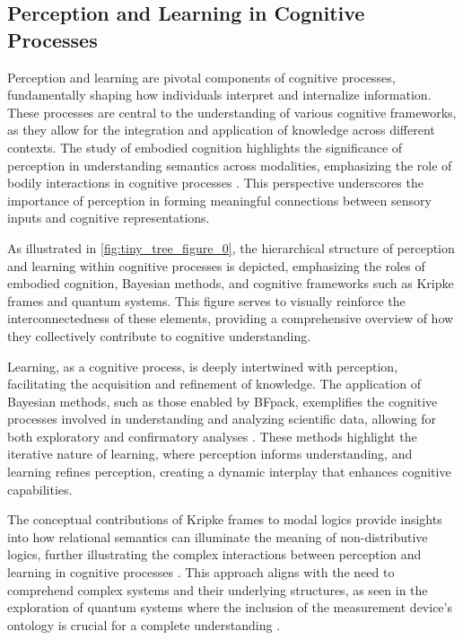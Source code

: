 \subsection{Perception and Learning in Cognitive Processes} \label{subsec:Perception and Learning in Cognitive Processes}

Perception and learning are pivotal components of cognitive processes, fundamentally shaping how individuals interpret and internalize information. These processes are central to the understanding of various cognitive frameworks, as they allow for the integration and application of knowledge across different contexts. The study of embodied cognition highlights the significance of perception in understanding semantics across modalities, emphasizing the role of bodily interactions in cognitive processes \cite{raposo2019lowdimensionalembodiedsemanticsmusic}. This perspective underscores the importance of perception in forming meaningful connections between sensory inputs and cognitive representations. 

As illustrated in \autoref{fig:tiny_tree_figure_0}, the hierarchical structure of perception and learning within cognitive processes is depicted, emphasizing the roles of embodied cognition, Bayesian methods, and cognitive frameworks such as Kripke frames and quantum systems. This figure serves to visually reinforce the interconnectedness of these elements, providing a comprehensive overview of how they collectively contribute to cognitive understanding.

Learning, as a cognitive process, is deeply intertwined with perception, facilitating the acquisition and refinement of knowledge. The application of Bayesian methods, such as those enabled by BFpack, exemplifies the cognitive processes involved in understanding and analyzing scientific data, allowing for both exploratory and confirmatory analyses \cite{mulder2019bfpackflexiblebayesfactor}. These methods highlight the iterative nature of learning, where perception informs understanding, and learning refines perception, creating a dynamic interplay that enhances cognitive capabilities.

The conceptual contributions of Kripke frames to modal logics provide insights into how relational semantics can illuminate the meaning of non-distributive logics, further illustrating the complex interactions between perception and learning in cognitive processes \cite{conradie2021nondistributivelogicssemanticsmeaning}. This approach aligns with the need to comprehend complex systems and their underlying structures, as seen in the exploration of quantum systems where the inclusion of the measurement device's ontology is crucial for a complete understanding \cite{charrakh2017realitywavefunction}.

